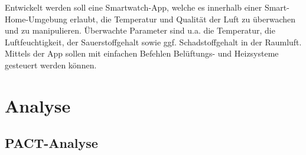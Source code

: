 \documentclass[a4paper,10pt]{article}
\begin{document}
\kopf
\renewcommand{\figurename}{Figure}


Entwickelt werden soll eine Smartwatch-App, welche es innerhalb einer Smart-Home-Umgebung erlaubt, die Temperatur und Qualität der Luft zu überwachen und zu manipulieren. Überwachte Parameter sind u.a. die Temperatur, die Luftfeuchtigkeit, der Sauerstoffgehalt sowie ggf. Schadstoffgehalt in der Raumluft. Mittels der App sollen mit einfachen Befehlen Belüftungs- und Heizsysteme gesteuert werden können.

\tableofcontents

\newpage



\section{Analyse}

\subsection{PACT-Analyse}
\end{document}
